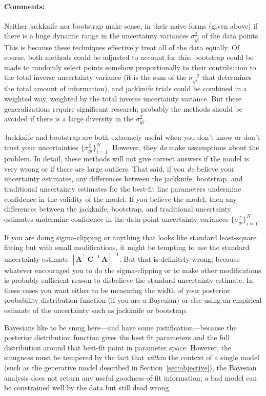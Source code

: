 \documentclass[12pt,twoside]{article}
\newcommand{\sectionname}{Section}
\newcommand{\commentsname}{Comments}
\newcounter{problem}
\newenvironment{comments}{\paragraph{\commentsname:}}{}
\newcommand{\mmatrix}[1]{\boldsymbol{#1}}
\newcommand{\inverse}[1]{{#1}^{-1}}
\newcommand{\transpose}[1]{{#1}^{\scriptscriptstyle \top}}
\newcommand{\mA}{\mmatrix{A}}
\newcommand{\mAT}{\transpose{\mA}}
\newcommand{\mC}{\mmatrix{C}}
\newcommand{\mCinv}{\inverse{\mC}}
\newcommand{\setofall}[3]{\{{#1}\}_{{#2}}^{{#3}}}
\newcommand{\allsigmay}{\setofall{\sigma_{yi}^2}{i=1}{N}}
\begin{document}
\begin{comments}
Neither jackknife nor bootstrap make sense, in their naive forms
(given above) if there is a huge dynamic range in the uncertainty
variances $\sigma_{yi}^2$ of the data points.  This is because these
techniques effectively treat all of the data equally.  Of course, both
methods could be adjusted to account for this; bootstrap could be made
to randomly select points somehow proportionally to their contribution
to the total inverse uncertainty variance (it is the sum of the
$\sigma_{yi}^{-2}$ that determines the total amount of information),
and jackknife trials could be combined in a weighted way, weighted by
the total inverse uncertainty variance.  But these generalizations
require significant research; probably the methods should be avoided
if there is a large diversity in the $\sigma_{yi}^2$.

Jackknife and bootstrap are both extremely useful when you don't know
or don't trust your uncertainties $\allsigmay$.  However, they
\emph{do} make assumptions about the problem.  In detail, these
methods will not give correct answers if the model is very wrong or if
there are large outliers.  That said, if you \emph{do} believe your
uncertainty estimates, any differences between the jackknife,
bootstrap, and traditional uncertainty estimates for the best-fit line
parameters undermine confidence in the validity of the model.  If you
believe the model, then any differences between the jackknife,
bootstrap, and traditional uncertainty estimates undermine confidence
in the data-point uncertainty variances $\allsigmay$.

If you are doing sigma-clipping or anything that looks like standard
least-square fitting but with small modifications, it might be
tempting to use the standard uncertainty estimate
$\inverse{\left[\mAT\,\mCinv\,\mA\right]}$.  But that is definitely
wrong, because whatever encouraged you to do the sigma-clipping or to
make other modifications is probably sufficient reason to disbelieve
the standard uncertainty estimate.  In these cases you want either to
be measuring the width of your posterior probability distribution
function (if you are a Bayesian) or else using an empirical estimate
of the uncertainty such as jackknife or bootstrap.

Bayesians like to be smug here---and have some justification---because
the posterior distribution function gives the best fit parameters and
the full distribution around that best-fit point in parameter space.
However, the smugness must be tempered by the fact that \emph{within}
the context of a single model (such as the generative model described
in \sectionname~\ref{sec:objective}), the Bayesian analysis does not
return any useful goodness-of-fit information; a bad model can be
constrained well by the data but still dead wrong.
\end{comments}
\end{document}

